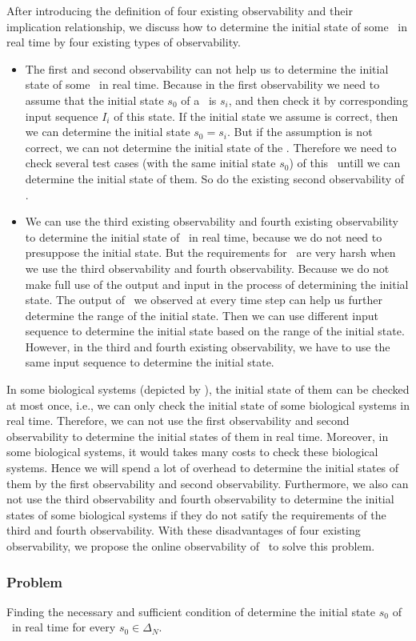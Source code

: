 After introducing the definition of four existing observability and their implication relationship, we discuss how to determine the initial state of some \BCNs\ in real time by four existing types of observability. 
\begin{itemize}
\item The first and second observability can not help us to determine the initial state of some \BCNs\ in real time. Because in the first observability we need to assume that the initial state $s_0$ of a \BCN\ is $s_i$, and then check it by corresponding input sequence $I_i$ of this state. If the initial state we assume is correct, then we can determine the initial state $s_0=s_i$. But if the assumption is not correct, we can not determine the initial state of the \BCN. Therefore we need to check several test cases (with the same initial state $s_0$) of this \BCN\ untill we can determine the initial state of them. So do the existing second observability of \BCNs.
\item We can use the third existing observability and fourth existing observability to determine the initial state of \BCNs\ in real time, because we do not need to presuppose the initial state. But the requirements for \BCNs\ are very harsh when we use the third observability and fourth observability. Because we do not make full use of the output and input in the process of determining the initial state. The output of \BCNs\ we observed at every time step can help us further determine the range of the initial state. Then we can use different input sequence to determine the initial state based on the range of the initial state. However, in the third and fourth existing observability, we have to use the same input sequence to determine the initial state.
\end{itemize} 
 
In some biological systems (depicted by \BCNs), the initial state of them can be checked at most once, i.e., we can only check the initial state of some biological systems in real time. Therefore, we can not use the first observability and second observability to determine the initial states of them in real time. Moreover, in some biological systems, it would takes many costs to check these biological systems. Hence we will spend a lot of overhead to determine the initial states of them by the first observability and second observability. Furthermore, we also can not use the third observability and fourth observability to determine the initial states of some biological systems if they do not satify the requirements of the third and fourth observability. With these disadvantages of four existing observability, we propose the online observability of \BCNs\ to solve this problem.
 \subsubsection*{Problem}
Finding the necessary and sufficient condition of determine the initial state $s_0$ of \BCNs\ in real time for every $s_0\in \Delta_N$.